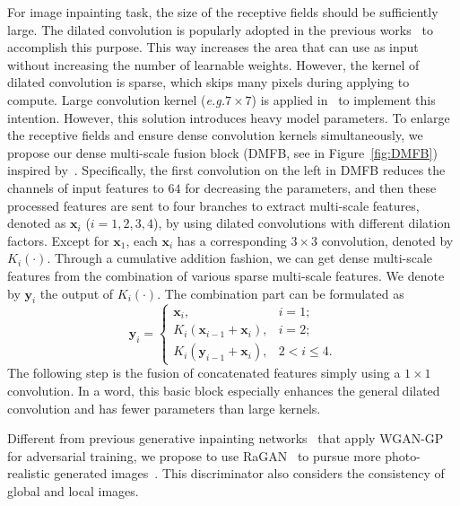 \documentclass[journal]{IEEEtran}
\newcommand{\eg}{\emph{e.g.}}
\begin{document}
For image inpainting task, the size of the receptive fields should be sufficiently large. The dilated convolution is popularly adopted in the previous works~\cite{globally-and-locally,contextual-attention} to accomplish this purpose. This way increases the area that can use as input without increasing the number of learnable weights. However, the kernel of dilated convolution is sparse, which skips many pixels during applying to compute. Large convolution kernel (\eg $7 \times 7$) is applied in~\cite{GMCNN} to implement this intention. However, this solution introduces heavy model parameters. To enlarge the receptive fields and ensure dense convolution kernels simultaneously, we propose our dense multi-scale fusion block (DMFB, see in Figure~\ref{fig:DMFB}) inspired by~\cite{Hui-PPON-2019}. Specifically, the first convolution on the left in DMFB reduces the channels of input features to $64$ for decreasing the parameters, and then these processed features are sent to four branches to extract multi-scale features, denoted as ${\mathbf{x}_i}$ ($i = 1,2,3,4$), by using dilated convolutions with different dilation factors. Except for ${\mathbf{x}_1}$, each ${\mathbf{x}_i}$ has a corresponding $3 \times 3$ convolution, denoted by ${K_i}\left(  \cdot  \right)$. Through a cumulative addition fashion, we can get dense multi-scale features from the combination of various sparse multi-scale features. We denote by ${\mathbf{y}_i}$ the output of ${K_i}\left(  \cdot  \right)$. The combination part can be formulated as
\begin{equation}
{\mathbf{y}_i} = \begin{cases}
{\mathbf{x}_i}, & i=1; \\
{K_i}\left( {{\mathbf{x}_{i - 1}} + {\mathbf{x}_i}} \right), & i=2; \\
{K_i}\left( {{\mathbf{y}_{i - 1}} + {\mathbf{x}_i}} \right), & 2 < i \le 4.
\end{cases}
\end{equation}
The following step is the fusion of concatenated features simply using a $1 \times 1$ convolution. In a word, this basic block especially enhances the general dilated convolution and has fewer parameters than large kernels.

Different from previous generative inpainting networks~\cite{contextual-attention,GMCNN} that apply WGAN-GP~\cite{WGAN-GP} for adversarial training, we propose to use RaGAN~\cite{RaGAN} to pursue more photo-realistic generated images~\cite{ESRGAN}. This discriminator also considers the consistency of global and local images.
\end{document}
